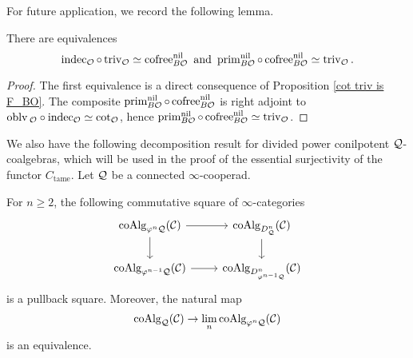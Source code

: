 For future application, we record the following lemma.
\begin{lemma}
\cite[(3.4) and (3.5)]{Francis-Gaitsgory}
\label{CE of Trivial is cofree}
There are equivalences
$$
\operatorname{indec}_{{\mathcal{O}}}\circ\operatorname{triv}_{{\mathcal{O}}} \simeq \operatorname{cofree}^{\operatorname{nil}}_{B{\mathcal{O}}}  \text{ and } 
\operatorname{prim}_{B{\mathcal{O}}}^{\operatorname{nil}} \circ \operatorname{cofree}^{\operatorname{nil}}_{B{\mathcal{O}}} \simeq \operatorname{triv}_{{\mathcal{O}}}.
$$
\end{lemma}
\begin{proof}
    The first equivalence is a direct consequence of Proposition \ref{cot triv is F_BO}.
    The composite $\operatorname{prim}_{B{\mathcal{O}}}^{\operatorname{nil}} \circ \operatorname{cofree}^{\operatorname{nil}}_{B{\mathcal{O}}}$ is right adjoint to
    $\operatorname{oblv}{_{{\mathcal{O}}}\circ \operatorname{indec}_{{\mathcal{O}}}}\simeq \cot_{{\mathcal{O}}}$, hence $\operatorname{prim}_{B{\mathcal{O}}}^{\operatorname{nil}} \circ \operatorname{cofree}^{\operatorname{nil}}_{B{\mathcal{O}}} \simeq \operatorname{triv}_{{\mathcal{O}}}$.
\end{proof}



We also have the following decomposition result for divided power conilpotent ${\mathcal{Q}}$-coalgebras, which will be used in the proof of the essential surjectivity of the functor $C_{\operatorname{tame}}$. Let ${\mathcal{Q}}$ be a connected $\infty$-cooperad.
\begin{proposition}
\cite[Theorem 4.12]{Heuts_Koszul}
\label{inductive construction of coalgebras}
    For $n\geq 2$, the following commutative square of $\infty$-categories 
\[
\begin{tikzcd}
	\coAlg_{\varphi^n \CQ}(\CC) & 
	\coAlg_{D^n_{\CQ}}(\CC)\\
	\coAlg_{\varphi^{n-1} \CQ}(\CC) & 
	\coAlg_{D^n_{\varphi^{n-1}\CQ}}(\CC)
	\arrow[from=1-1, to= 1-2]
	\arrow[from=1-1, to=2-1]
	\arrow[from=1-2, to=2-2]
	\arrow[from=2-1, to= 2-2]
\end{tikzcd}
\]
is a pullback square. Moreover, the natural map
$$
\operatorname{coAlg}_{{\mathcal{Q}}}({\mathcal{C}}) \to \lim_n \operatorname{coAlg}_{\varphi^n{\mathcal{Q}}}({\mathcal{C}})
$$
is an equivalence.
\end{proposition}


